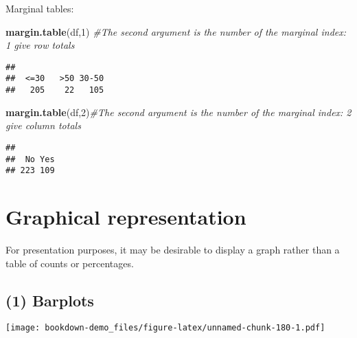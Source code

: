 \documentclass[]{book}
\newenvironment{Shaded}{\begin{snugshade}}{\end{snugshade}}
\newcommand{\KeywordTok}[1]{\textcolor[rgb]{0.13,0.29,0.53}{\textbf{#1}}}
\newcommand{\DataTypeTok}[1]{\textcolor[rgb]{0.13,0.29,0.53}{#1}}
\newcommand{\DecValTok}[1]{\textcolor[rgb]{0.00,0.00,0.81}{#1}}
\newcommand{\StringTok}[1]{\textcolor[rgb]{0.31,0.60,0.02}{#1}}
\newcommand{\CommentTok}[1]{\textcolor[rgb]{0.56,0.35,0.01}{\textit{#1}}}
\newcommand{\OperatorTok}[1]{\textcolor[rgb]{0.81,0.36,0.00}{\textbf{#1}}}
\newcommand{\NormalTok}[1]{#1}
\theoremstyle{definition}
\theoremstyle{definition}
\theoremstyle{definition}
\theoremstyle{remark}
\begin{document}
Marginal tables:

\begin{Shaded}
\begin{Highlighting}[]
\KeywordTok{margin.table}\NormalTok{(df,}\DecValTok{1}\NormalTok{) }\CommentTok{#The second argument  is the number of the marginal index: 1  give row totals}
\end{Highlighting}
\end{Shaded}

\begin{verbatim}
## 
##  <=30   >50 30-50 
##   205    22   105
\end{verbatim}

\begin{Shaded}
\begin{Highlighting}[]
\KeywordTok{margin.table}\NormalTok{(df,}\DecValTok{2}\NormalTok{)}\CommentTok{#The second argument  is the number of the marginal index: 2 give column totals}
\end{Highlighting}
\end{Shaded}

\begin{verbatim}
## 
##  No Yes 
## 223 109
\end{verbatim}

\section{Graphical representation}\label{graphical-representation-3}

For presentation purposes, it may be desirable to display a graph rather
than a table of counts or percentages.

\subsection{(1) Barplots}\label{barplots}

\begin{Shaded}
\end{Shaded}

\texttt{[image: bookdown-demo\_files/figure-latex/unnamed-chunk-180-1.pdf]}
\end{document}
